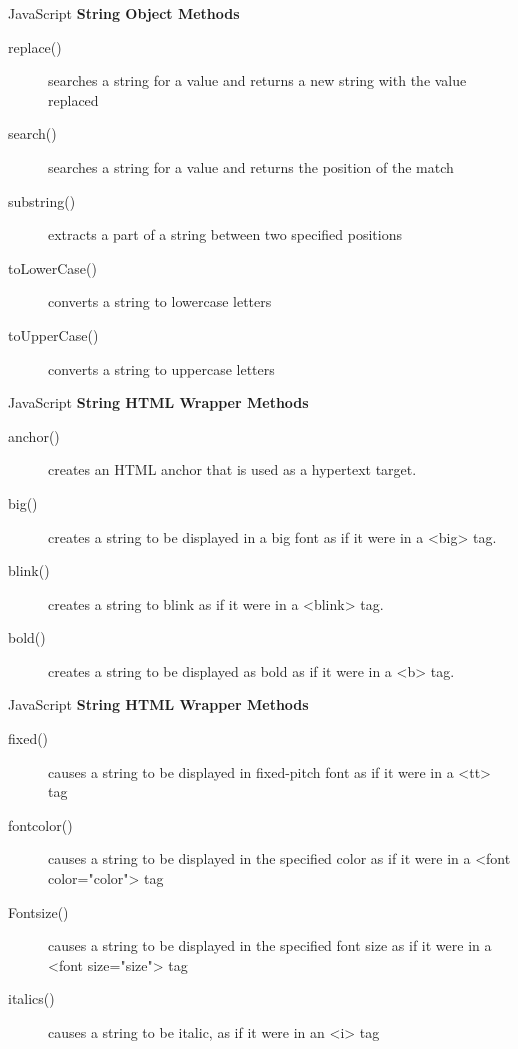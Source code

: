 \documentclass[14pt]{beamer}
\begin{document}
\begin{frame}{JavaScript}
\textbf{String Object Methods}

\vspace{1pc}
\small
\begin{description}
 \item [replace()] searches a string for a value and returns a new string with the value replaced
 \item [search()] searches a string for a value and returns the position of the match
 \item [substring()] extracts a part of a string between two specified positions
 \item [toLowerCase()] converts a string to lowercase letters
 \item [toUpperCase()] converts a string to uppercase letters
 \end{description}
\end{frame}

\begin{frame}{JavaScript}
\textbf{String HTML Wrapper Methods}

\begin{description}
 \item [anchor()] creates an HTML anchor that is used as a hypertext target.
 \item [big()] creates a string to be displayed in a big font as if it were in a <big> tag.
 \item [blink()] creates a string to blink as if it were in a <blink> tag.
 \item [bold()] creates a string to be displayed as bold as if it were in a <b> tag.
\end{description}
\end{frame}

\begin{frame}{JavaScript}
\textbf{String HTML Wrapper Methods}

\begin{description}
 \item [fixed()] causes a string to be displayed in fixed-pitch font as if it were in a <tt> tag
 \item [fontcolor()] causes a string to be displayed in the specified color as if it were in a <font color="color"> tag
 \item [Fontsize()] causes a string to be displayed in the specified font size as if it were in a <font size="size"> tag
 \item [italics()] causes a string to be italic, as if it were in an <i> tag
\end{description}
\end{frame}
\end{document}
